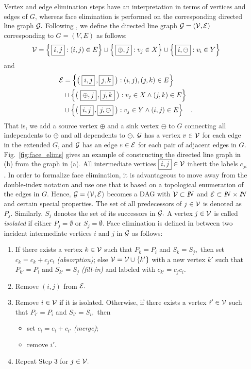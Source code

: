 \documentclass[11pt]{article}
\newcommand{\reffig}[1]{{Fig.~\ref{#1}}}
\begin{document}
Vertex and edge elimination steps have an 
interpretation in terms of vertices and edges
of $G$, whereas face elimination is performed on 
the corresponding directed line graph $\cal G.$
Following \cite{ElimTechMP}, we define the directed line graph $\cal G=(V,E)$ 
corresponding to $G=(V,E)$ as follows:
\[
{\cal V}=
\left\{\,\framebox{$i,j$}      :(i,j)\in E \right\} \cup 
\left\{\,\framebox{$\oplus,j$} :v_j  \in X \right\} \cup 
\left\{\,\framebox{$i,\ominus$}:v_i  \in Y \right\}
\] 
and 
\begin{align*}
{\cal E}
&=    \left\{\big(\;\framebox{$i,j$}     \,,\framebox{$j,k$}      \;\big): (i,j),(j,k) \in E        \right\} \\
&\cup \left\{\big(\;\framebox{$\oplus,j$}\,,\framebox{$j,k$}      \;\big): v_j\in X \land (j,k)\in E\right\} \\
&\cup \left\{\big(\;\framebox{$i,j$}     \,,\framebox{$j,\ominus$}\;\big): v_j\in Y \land (i,j)\in E\right\} 
\quad . \\
\end{align*}
That is, 
we add a source vertex $\oplus$ and a sink vertex 
$\ominus$ to $G$ connecting all independents to $\oplus$
and all dependents to $\ominus$. $\cal G$ has   
a vertex $ v \in \cal V$ for each edge in the extended $G$, 
and $\cal G$ has an edge $ e \in \cal E$ for each 
pair of adjacent edges in $G$. \reffig{fig:face_elims} gives an 
example of constructing the directed line graph in (b) from the graph in (a).   
All intermediate vertices $\framebox{$i,j$} \in \cal V$ inherit the labels  
$c_{ji}$. In order to formalize face elimination, it is advantageous to move away
from the double-index notation and use one that is based on a topological
enumeration of the edges in $G.$ Hence, ${\cal G}=({\cal V}, {\cal E})$ 
becomes a DAG with ${\cal V} \subset I\!\!N$ and
${\cal E} \subset I\!\!N \times I\!\!N$ and
certain special properties.
The set of all predecessors of $j \in {\cal V}$ is denoted as $P_j.$ 
Similarly, $S_j$ denotes the set of its successors in $\cal G.$ 
A vertex 
$j \in \cal V$ is called {\em isolated} if either 
$P_j=\emptyset$ or
$S_j=\emptyset.$ 
Face elimination is defined in \cite{ElimTechMP}
between two incident intermediate vertices $i$ and $j$ in $\cal G$ as follows:
\begin{enumerate}
\item If there exists a vertex $k \in \cal V$ such that $P_k = P_i$ and
$S_k = S_j,$ then
set $c_k = c_k + c_j c_i$ {\em (absorption)};
else ${\cal V}={\cal V} \cup \{k'\}$ with a new vertex $k'$ such that
$P_{k'} = P_i$ and $S_{k'} = S_j$
{\em (fill-in)} and labeled with $c_{k'} = c_j c_i.$
\item Remove $(i,j)$ from $\cal E.$
\item Remove $i \in \cal V$ if it is isolated. Otherwise, if there exists a vertex $i' \in \cal V$ such that
$P_{i'} = P_i$ and $S_{i'} = S_i,$ then
\begin{itemize}
\item set $c_i=c_i + c_{i'}$ {\em (merge)};
\item remove $i'.$
\end{itemize}
\item Repeat Step 3 for $j \in \cal V.$
\end{enumerate}
\end{document}
